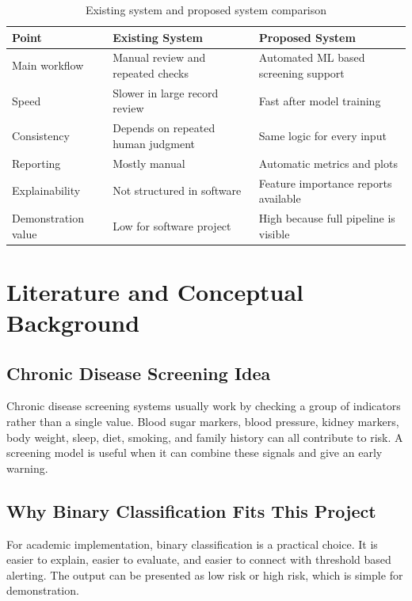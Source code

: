 \documentclass[12pt,a4paper,openany]{report}
\begin{document}
    \begin{table}[H]
    \centering
    \caption{Existing system and proposed system comparison}
    \begin{tabularx}{\textwidth}{>{\raggedright\arraybackslash}p{4.7cm} X X}
    \toprule
    \textbf{Point} & \textbf{Existing System} & \textbf{Proposed System} \\
    \midrule
    Main workflow & Manual review and repeated checks & Automated ML based screening support \\
    Speed & Slower in large record review & Fast after model training \\
    Consistency & Depends on repeated human judgment & Same logic for every input \\
    Reporting & Mostly manual & Automatic metrics and plots \\
    Explainability & Not structured in software & Feature importance reports available \\
    Demonstration value & Low for software project & High because full pipeline is visible \\
    \bottomrule
    \end{tabularx}
    \end{table}

    \chapter{Literature and Conceptual Background}
    \section{Chronic Disease Screening Idea}
    Chronic disease screening systems usually work by checking a group of indicators rather than a single value. Blood sugar markers, blood pressure, kidney markers, body weight, sleep, diet, smoking, and family history can all contribute to risk. A screening model is useful when it can combine these signals and give an early warning.

    \section{Why Binary Classification Fits This Project}
    For academic implementation, binary classification is a practical choice. It is easier to explain, easier to evaluate, and easier to connect with threshold based alerting. The output can be presented as low risk or high risk, which is simple for demonstration.
\end{document}
